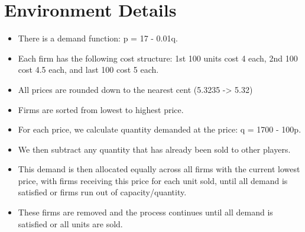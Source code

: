 \documentclass[11pt]{article}
\begin{document}
\section{Environment Details}
\label{sec:org5451ef6}
\begin{itemize}
\item There is a demand function: p = 17 - 0.01q.
\item Each firm has the following cost structure: 1st 100 units cost 4 each, 2nd 100 cost 4.5 each, and last 100 cost 5 each.
\item All prices are rounded down to the nearest cent (5.3235 -> 5.32)
\item Firms are sorted from lowest to highest price.
\item For each price, we calculate quantity demanded at the price: q = 1700 - 100p.
\item We then subtract any quantity that has already been sold to other players.
\item This demand is then allocated equally across all firms with the current lowest price, with firms receiving this price for each unit sold, until all demand is satisfied or firms run out of capacity/quantity.
\item These firms are removed and the process continues until all demand is satisfied or all units are sold.
\end{itemize}
\end{document}
